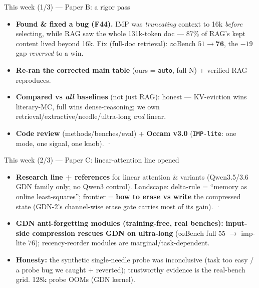 \begin{frame}{This week (1/3) --- Paper B: a rigor pass}
  \small
  \begin{itemize}
    \item \textbf{Found \& fixed a bug (F44).} IMP was \emph{truncating} context to 16k \emph{before} selecting, while RAG saw the whole 131k-token doc --- 87\% of RAG's kept content lived beyond 16k. Fix (full-doc retrieval): $\infty$Bench $51 \to \textbf{76}$, the $-19$ gap \emph{reversed} to a win. 
    \item \textbf{Re-ran the corrected main table} (ours = \texttt{auto}, full-N) + verified RAG reproduces. 
    \item \textbf{Compared vs \emph{all} baselines} (not just RAG): honest --- KV-eviction wins literary-MC, full wins dense-reasoning; we own retrieval/extractive/needle/ultra-long \emph{and} linear. 
    \item \textbf{Code review} (methods/benches/eval) + \textbf{Occam v3.0} (\texttt{IMP-lite}: one mode, one signal, one knob).  · 
  \end{itemize}
\end{frame}

\begin{frame}{This week (2/3) --- Paper C: linear-attention line opened}
  \small
  \begin{itemize}
    \item \textbf{Research line + references} for linear attention \& variants (Qwen3.5/3.6 GDN family only; no Qwen3 control). Landscape: delta-rule = ``memory as online least-squares''; frontier = \textbf{how to erase vs write} the compressed state (GDN-2's channel-wise erase gate carries most of its gain).  · 
    \item \textbf{GDN anti-forgetting modules (training-free, real benches):} \textbf{input-side compression rescues GDN on ultra-long} ($\infty$Bench full 55 $\to$ imp-lite 76); recency-reorder modules are marginal/task-dependent. 
    \item \textbf{Honesty:} the synthetic single-needle probe was inconclusive (task too easy / a probe bug we caught + reverted); trustworthy evidence is the real-bench grid. 128k probe OOMs (GDN kernel).
  \end{itemize}
\end{frame}

